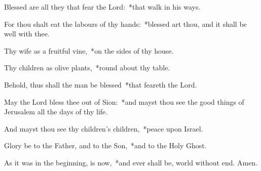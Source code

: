 \begin{enpars}
\item Blessed are all they that fear the Lord:~*that walk in his ways.
\item For thou shalt eat the labours of thy hands:~*blessed art thou, and it shall be well with thee.
\item Thy wife as a fruitful vine,~*on the sides of thy house.
\item Thy children as olive plants,~*round about thy table.
\item Behold, thus shall the man be blessed~*that feareth the Lord.
\item May the Lord bless thee out of Sion:~*and mayst thou see the good things of Jerusalem all the days of thy life.
\item And mayst thou see thy children’s children,~*peace upon Israel.
\item Glory be to the Father, and to the Son,~*and to the Holy Ghost. 
\item As it was in the beginning, is now,~*and ever shall be, world without end. Amen.
\end{enpars}